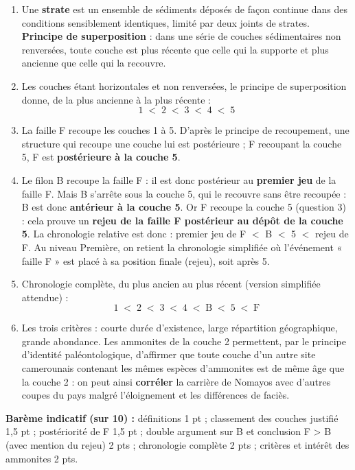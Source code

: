\documentclass[11pt]{article}
\newcommand{\cle}[1]{{\popxbold\color{popdark}#1}}
\begin{document}
\begin{corrige}

\begin{enumerate}
\item Une \textbf{strate} est un ensemble de sédiments déposés de façon continue dans des conditions sensiblement identiques, limité par deux joints de strates. \textbf{Principe de superposition} : dans une série de couches sédimentaires non renversées, toute couche est plus récente que celle qui la supporte et plus ancienne que celle qui la recouvre.
\item Les couches étant horizontales et non renversées, le principe de superposition donne, de la plus ancienne à la plus récente :
\[ 1 \;<\; 2 \;<\; 3 \;<\; 4 \;<\; 5 \]
\item La faille F recoupe les couches 1 à 5. D'après le principe de recoupement, une structure qui recoupe une couche lui est postérieure ; F recoupant la couche 5, F est \textbf{postérieure à la couche 5}.
\item Le filon B recoupe la faille F : il est donc postérieur au \textbf{premier jeu} de la faille F. Mais B s'arrête sous la couche 5, qui le recouvre sans être recoupée : B est donc \textbf{antérieur à la couche 5}. Or F recoupe la couche 5 (question 3) : cela prouve un \textbf{rejeu de la faille F postérieur au dépôt de la couche 5}. La chronologie relative est donc : premier jeu de F $<$ B $<$ 5 $<$ rejeu de F. Au niveau Première, on retient la chronologie simplifiée où l'événement « faille F » est placé à sa position finale (rejeu), soit après 5.
\item Chronologie complète, du plus ancien au plus récent (version simplifiée attendue) :
\[ 1 \;<\; 2 \;<\; 3 \;<\; 4 \;<\; \text{B} \;<\; 5 \;<\; \text{F} \]
\item Les trois critères : courte durée d'existence, large répartition géographique, grande abondance. Les ammonites de la couche 2 permettent, par le \cle{principe d'identité paléontologique}, d'affirmer que toute couche d'un autre site camerounais contenant les mêmes espèces d'ammonites est de même âge que la couche 2 : on peut ainsi \textbf{corréler} la carrière de Nomayos avec d'autres coupes du pays malgré l'éloignement et les différences de faciès.
\end{enumerate}

\textbf{Barème indicatif (sur 10) :} définitions 1 pt ; classement des couches justifié 1,5 pt ; postériorité de F 1,5 pt ; double argument sur B et conclusion F > B (avec mention du rejeu) 2 pts ; chronologie complète 2 pts ; critères et intérêt des ammonites 2 pts.
\end{corrige}
\end{document}
